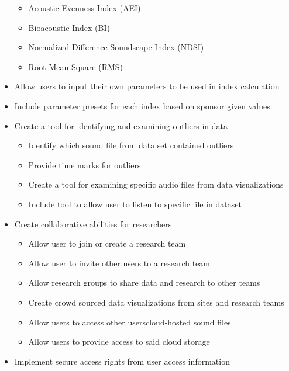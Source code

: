 \begin{itemize}
\begin{itemize}
      \item Acoustic Evenness Index (AEI)
      \item Bioacoustic Index (BI)
      \item Normalized Difference Soundscape Index (NDSI)
      \item Root Mean Square (RMS)
    \end{itemize}
  \item Allow users to input their own parameters to be used in index calculation
  \item Include parameter presets for each index based on sponsor given values
  \item Create a tool for identifying and examining outliers in data
    \begin{itemize}
      \item Identify which sound file from data set contained outliers
      \item Provide time marks for outliers
      \item Create a tool for examining specific audio files from data visualizations
      \item Include tool to allow user to listen to specific file in dataset
    \end{itemize}
  \item Create collaborative abilities for researchers
    \begin{itemize}
      \item Allow user to join or create a research team
      \item Allow user to invite other users to a research team
      \item Allow research groups to share data and research to other teams
      \item Create crowd sourced data visualizations from sites and research teams
      \item Allow users to access other users\textquotesingle cloud-hosted sound files
      \item Allow users to provide access to said cloud storage
    \end{itemize}
  \item Implement secure access rights from user access information
\end{itemize}
